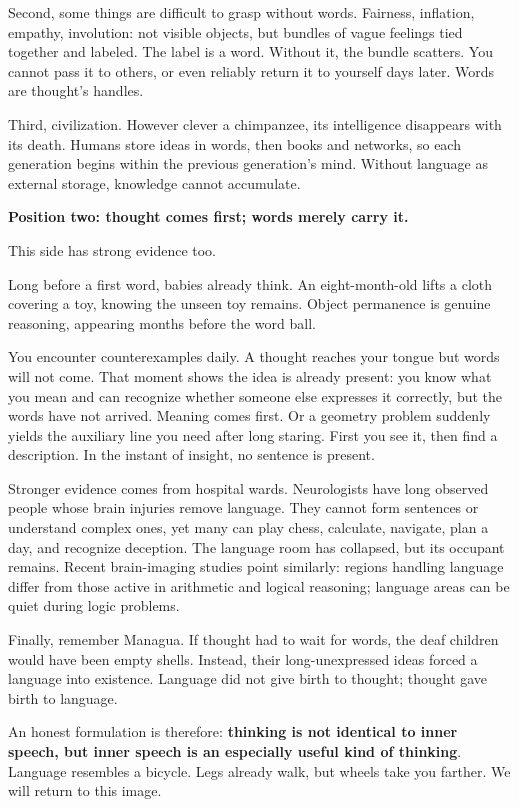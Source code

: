Second, some things are difficult to grasp without words. Fairness, inflation, empathy, involution: not visible objects, but bundles of vague feelings tied together and labeled. The label is a word. Without it, the bundle scatters. You cannot pass it to others, or even reliably return it to yourself days later. Words are thought's handles.

Third, civilization. However clever a chimpanzee, its intelligence disappears with its death. Humans store ideas in words, then books and networks, so each generation begins within the previous generation's mind. Without language as external storage, knowledge cannot accumulate.

\textbf{Position two: thought comes first; words merely carry it.}

This side has strong evidence too.

Long before a first word, babies already think. An eight-month-old lifts a cloth covering a toy, knowing the unseen toy remains. Object permanence is genuine reasoning, appearing months before the word ball.

You encounter counterexamples daily. A thought reaches your tongue but words will not come. That moment shows the idea is already present: you know what you mean and can recognize whether someone else expresses it correctly, but the words have not arrived. Meaning comes first. Or a geometry problem suddenly yields the auxiliary line you need after long staring. First you see it, then find a description. In the instant of insight, no sentence is present.

Stronger evidence comes from hospital wards. Neurologists have long observed people whose brain injuries remove language. They cannot form sentences or understand complex ones, yet many can play chess, calculate, navigate, plan a day, and recognize deception. The language room has collapsed, but its occupant remains. Recent brain-imaging studies point similarly: regions handling language differ from those active in arithmetic and logical reasoning; language areas can be quiet during logic problems.

Finally, remember Managua. If thought had to wait for words, the deaf children would have been empty shells. Instead, their long-unexpressed ideas forced a language into existence. Language did not give birth to thought; thought gave birth to language.

An honest formulation is therefore: \textbf{thinking is not identical to inner speech, but inner speech is an especially useful kind of thinking}. Language resembles a bicycle. Legs already walk, but wheels take you farther. We will return to this image.

